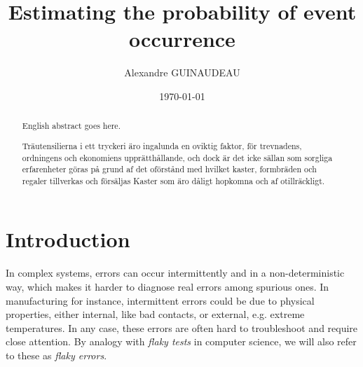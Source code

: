 \documentclass{kththesis}
\title{Estimating the probability of event occurrence}
\author{Alexandre GUINAUDEAU}
\date{\today}
\begin{document}
\frontmatter

\titlepage

\begin{abstract}
  English abstract goes here.

\end{abstract}


\begin{otherlanguage}{swedish}
  \begin{abstract}
    Träutensilierna i ett tryckeri äro ingalunda en oviktig faktor,
    för trevnadens, ordningens och ekonomiens upprätthållande, och
    dock är det icke sällan som sorgliga erfarenheter göras på grund
    af det oförstånd med hvilket kaster, formbräden och regaler
    tillverkas och försäljas Kaster som äro dåligt hopkomna och af
    otillräckligt.
  \end{abstract}
\end{otherlanguage}


\tableofcontents


\mainmatter

%
%


\chapter*{Introduction}

In complex systems, errors can occur intermittently and in a non-deterministic way, which makes it harder to diagnose real errors among spurious ones. 
In manufacturing for instance, intermittent errors could be due to physical properties, either internal, like bad contacts, or external, e.g. extreme temperatures.
In any case, these errors are often hard to troubleshoot and require close attention. By analogy with \emph{flaky tests} in computer science, we will also refer to these as \emph{flaky errors}.\\
\end{document}

